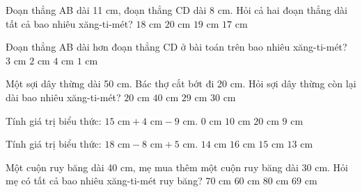 \begin{ex} %
Đoạn thẳng AB dài 11 cm, đoạn thẳng CD dài 8 cm. Hỏi cả hai đoạn thẳng dài tất cả bao nhiêu xăng-ti-mét?
\choice
{$18\text{ cm}$}
{$20\text{ cm}$}
{\True $19\text{ cm}$}
{$17\text{ cm}$}
\end{ex}

\begin{ex} %
Đoạn thẳng AB dài hơn đoạn thẳng CD ở bài toán trên bao nhiêu xăng-ti-mét?
\choice
{\True $3\text{ cm}$}
{$2\text{ cm}$}
{$4\text{ cm}$}
{$1\text{ cm}$}
\end{ex}

\begin{ex} %
Một sợi dây thừng dài 50 cm. Bác thợ cắt bớt đi 20 cm. Hỏi sợi dây thừng còn lại dài bao nhiêu xăng-ti-mét?
\choice
{$20\text{ cm}$}
{$40\text{ cm}$}
{$29\text{ cm}$}
{\True $30\text{ cm}$}
\end{ex}

\begin{ex} %
Tính giá trị biểu thức: $15\text{ cm} + 4\text{ cm} - 9\text{ cm}$.
\choice
{$0\text{ cm}$}
{\True $10\text{ cm}$}
{$20\text{ cm}$}
{$9\text{ cm}$}
\end{ex}

\begin{ex} %
Tính giá trị biểu thức: $18\text{ cm} - 8\text{ cm} + 5\text{ cm}$.
\choice
{$14\text{ cm}$}
{$16\text{ cm}$}
{\True $15\text{ cm}$}
{$13\text{ cm}$}
\end{ex}

\begin{ex} %
Một cuộn ruy băng dài 40 cm, mẹ mua thêm một cuộn ruy băng dài 30 cm. Hỏi mẹ có tất cả bao nhiêu xăng-ti-mét ruy băng?
\choice
{\True $70\text{ cm}$}
{$60\text{ cm}$}
{$80\text{ cm}$}
{$69\text{ cm}$}
\end{ex}

